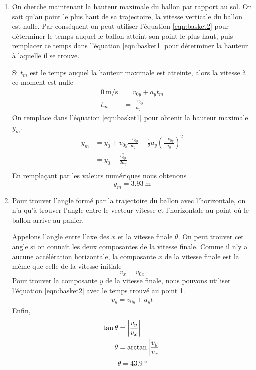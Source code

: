 \documentclass{tufte-handout}
\begin{document}
\begin{enumerate}
  \item On cherche maintenant la hauteur maximale du ballon par rapport au sol.
    On sait qu'au point le plus haut de sa trajectoire, la vitesse verticale du
    ballon est nulle.  Par conséquent on peut utiliser l'équation
    \ref{eqn:basket2} pour déterminer le temps auquel le ballon atteint son
    point le plus haut, puis remplacer ce temps dans l'équation
    \ref{eqn:basket1} pour déterminer la hauteur à laquelle il se trouve.

    Si $t_m$ est le temps auquel la hauteur maximale est atteinte, alors la
    vitesse à ce moment est nulle
    \begin{align*}
      \SI{0}{\meter\per\second} &= v_{0y} + a_y t_m \\
      t_m &= \frac{-v_{0y}}{a_y} 
    \end{align*}
    On remplace dans l'équation \ref{eqn:basket1} pour obtenir la hauteur
    maximale $y_m$.
    \begin{align*}
      y_m &= y_0 + v_{0y} \frac{-v_{0y}}{a_y} + \frac{1}{2}
             a_y \left(\frac{-v_{0y}}{a_y}\right)^2 \\
          &= y_0 - \frac{v_{0y}^2}{2a_y} \\
    \end{align*}
    En remplaçant par les valeurs numériques nous obtenons
    \[
      \boxed{y_m = \SI{3.93}{\meter}}
    \]

  \item Pour trouver l'angle formé par la trajectoire du ballon avec
    l'horizontale, on n'a qu'à trouver l'angle entre le vecteur vitesse et
    l'horizontale au point où le ballon arrive au panier.

    \begin{marginfigure}
    \end{marginfigure}

    Appelons l'angle entre l'axe des $x$ et la vitesse finale $\theta$.  On
    peut trouver cet angle si on connaît les deux composantes de la vitesse
    finale.  Comme il n'y a aucune accélération horizontale, la composante $x$
    de la vitesse finale est la même que celle de la vitesse initiale
    \[
      v_x = v_{0x}
    \]
    Pour trouver la composante $y$ de la vitesse finale, nous pouvons utiliser
    l'équation \ref{eqn:basket2} avec le temps trouvé au point 1.
    \begin{align*}
      v_y = v_{0y} + a_yt
    \end{align*}
    Enfin,
    \begin{align*}
      \tan \theta &= \left| \frac{v_y}{v_x} \right| \\
      \theta &= \arctan\left| \frac{v_y}{v_x} \right|
    \end{align*}
    \[
      \boxed{\theta = \SI{43.9}{\degree}}
    \]


\end{enumerate}
\end{document}
